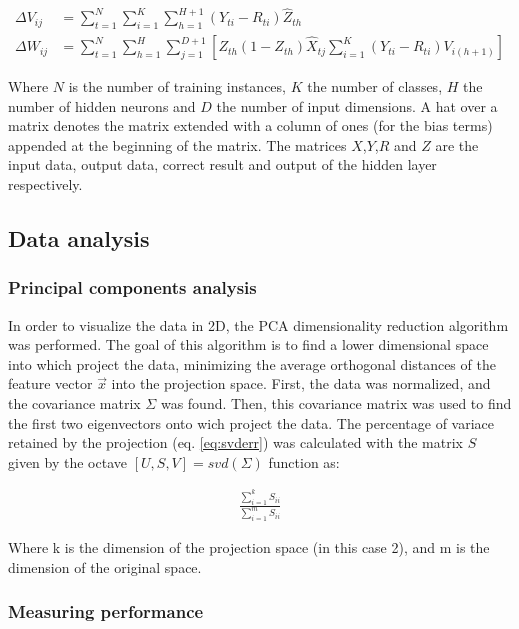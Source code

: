\documentclass{article}
\begin{document}
\begin{align}
\Delta V_{ij} &= \sum_{t=1}^{N}{ \sum_{i=1}^{K}{ \sum_{h=1}^{H+1}{(Y_{ti} - R_{ti}) \hat{Z}_{th}} } } \label{eq:gradV} \\ 
\Delta W_{ij} &= \sum_{t=1}^{N}{ \sum_{h=1}^{H}{ \sum_{j=1}^{D+1}{
    \left[ Z_{th}(1 - Z_{th})\hat{X}_{tj} \sum_{i=1}^{K}{ (Y_{ti} - R_{ti})V_{i(h+1)} } \right]
} } } \label{eq:gradW}
\end{align}

Where $N$ is the number of training instances, $K$ the number of classes, $H$ the number of hidden neurons 
and $D$ the number of input dimensions. A hat over a matrix denotes the matrix extended with a column of
ones (for the bias terms) appended at the beginning of the matrix. The matrices $X$,$Y$,$R$ and $Z$ are
the input data, output data, correct result and output of the hidden layer respectively.

\subsection{Data analysis}

\subsubsection{Principal components analysis}
In order to visualize the data in 2D, the PCA dimensionality reduction algorithm was performed.
The goal of this algorithm is to find a lower dimensional space into which project the data, minimizing
the average orthogonal distances of the feature vector $\vec{x}$ into the projection space. First, the data
was normalized, and the covariance matrix $\Sigma$ was found. Then, this covariance matrix was used to find the
first two eigenvectors onto wich project the data. The percentage of variace retained by the projection 
(eq. \ref{eq:svderr}) was calculated with the matrix $S$ given by the octave $[U,S,V] = svd(\Sigma)$ function as:

\begin{align}
\frac{\sum_{i=1}^{k}S_{ii}}{\sum_{i=1}^{m}S_{ii}} \label{eq:svderr}
\end{align}

Where k is the dimension of the projection space (in this case 2), and m is the dimension of the original space.

\subsubsection{Measuring performance}
\end{document}
